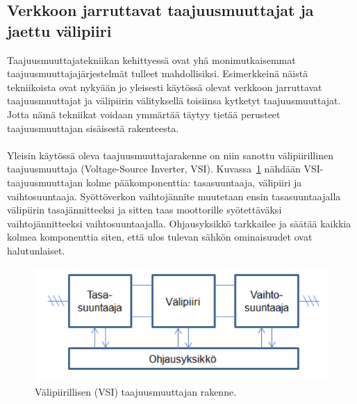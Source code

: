 \documentclass[finnish,12pt,a4paper,pdftex,elec,utf8]{aaltothesis}
\begin{document}






\subsection{Verkkoon jarruttavat taajuusmuuttajat ja jaettu välipiiri}
Taajuusmuuttajatekniikan kehittyessä ovat yhä monimutkaisemmat taajuusmuuttajajärjestelmät tulleet mahdollisiksi. Esimerkkeinä näistä tekniikoista ovat nykyään jo yleisesti käytössä olevat verkkoon jarruttavat taajuusmuuttajat ja välipiirin välityksellä toisiinsa kytketyt taajuusmuuttajat. Jotta nämä tekniikat voidaan ymmärtää täytyy tietää perusteet taajuusmuuttajan sisäisestä rakenteesta.
\\\\
Yleisin käytössä oleva taajuusmuuttajarakenne on niin sanottu välipiirillinen taajuusmuuttaja (Voltage-Source Inverter, VSI). Kuvassa~\ref{fig:VSI} nähdään VSI-taajuusmuuttajan kolme pääkomponenttia: tasasuuntaaja, välipiiri ja vaihtosuuntaaja. Syöttöverkon vaihtojännite muutetaan ensin tasasuuntaajalla välipiirin tasajännitteeksi ja sitten taas moottorille syötettäväksi vaihtojännitteeksi vaihtosuuntaajalla. Ohjausyksikkö tarkkailee ja säätää kaikkia kolmea komponenttia siten, että ulos tulevan sähkön ominaisuudet ovat halutunlaiset. \cite{ABBtechnicalguide}

\begin{figure}[H]
	\begin{center}
	\includegraphics[scale=0.65]{VSI}
	\end{center}
	\caption{Välipiirillisen (VSI) taajuusmuuttajan rakenne.
		 \cite[s. 2]{VSI}}
	\label{fig:VSI}
\end{figure}
\end{document}
